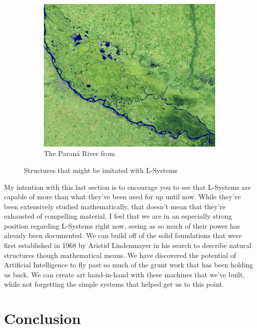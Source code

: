 \documentclass[12pt,twoside]{reedthesis}
\begin{document}
\begin{figure}[h]
\begin{subfigure}{0.52\linewidth}
		\includegraphics[width=\linewidth]{Images/ParanaRiver}
		\caption{The Paraná River from \cite{dauphin2020}}
		\label{ParanaRiver}
	\end{subfigure}
	\caption{Structures that might be imitated with L-Systems}
	\label{PossibleLSystems}
	\end{figure}
	
	My intention with this last section is to encourage you to see that L-Systems are capable of more than what they've been used for up until now. While they've been extensively studied mathematically, that doesn't mean that they're exhausted of compelling material. I feel that we are in an especially strong position regarding L-Systems right now, seeing as so much of their power has already been documented. We can build off of the solid foundations that were first established in 1968 by Aristid Lindenmayer in his search to describe natural structures though mathematical means. We have discovered the potential of Artificial Intelligence to fly past so much of the grunt work that has been holding us back. We can create art hand-in-hand with these machines that we've built, while not forgetting the simple systems that helped get us to this point.
	
\chapter*{Conclusion}
	\setcounter{section}{0}
	
\end{document}
